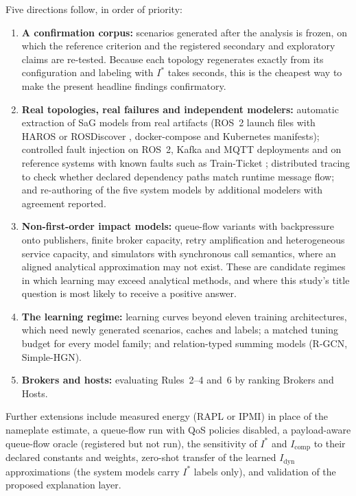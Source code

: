 \documentclass[preprint,3p]{elsarticle}
\providecommand{\tightlist}{%
  \setlength{\itemsep}{0pt}\setlength{\parskip}{0pt}}
\begin{document}
Five directions follow, in order of priority:
\begin{enumerate}\tightlist
    \item \textbf{A confirmation corpus:} scenarios generated after the analysis is frozen, on which the reference criterion and the registered secondary and exploratory claims are re-tested. Because each topology regenerates exactly from its configuration and labeling with $I^*$ takes seconds, this is the cheapest way to make the present headline findings confirmatory.
    \item \textbf{Real topologies, real failures and independent modelers:} automatic extraction of SaG models from real artifacts (ROS~2 launch files with HAROS or ROSDiscover \cite{santos2019haros,timperley2022rosdiscover}, docker-compose and Kubernetes manifests); controlled fault injection on ROS~2, Kafka and MQTT deployments and on reference systems with known faults such as Train-Ticket \cite{zhou2018trainticket}; distributed tracing to check whether declared dependency paths match runtime message flow; and re-authoring of the five system models by additional modelers with agreement reported.
    \item \textbf{Non-first-order impact models:} queue-flow variants with backpressure onto publishers, finite broker capacity, retry amplification and heterogeneous service capacity, and simulators with synchronous call semantics, where an aligned analytical approximation may not exist. These are candidate regimes in which learning may exceed analytical methods, and where this study's title question is most likely to receive a positive answer.
    \item \textbf{The learning regime:} learning curves beyond eleven training architectures, which need newly generated scenarios, caches and labels; a matched tuning budget for every model family; and relation-typed summing models (R-GCN, Simple-HGN).
    \item \textbf{Brokers and hosts:} evaluating Rules~2--4 and~6 by ranking Brokers and Hosts.
\end{enumerate}
Further extensions include measured energy (RAPL or IPMI) in place of the nameplate estimate, a queue-flow run with QoS policies disabled, a payload-aware queue-flow oracle (registered but not run), the sensitivity of $I^*$ and $I_{\text{comp}}$ to their declared constants and weights, zero-shot transfer of the learned $I_{\text{dyn}}$ approximations (the system models carry $I^*$ labels only), and validation of the proposed explanation layer.
\end{document}
